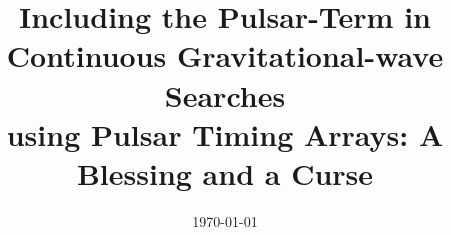 \documentclass[prd,showpacs,nofootinbib]{revtex4}
\begin{document}
\title{Including the Pulsar-Term in Continuous Gravitational-wave Searches\\ using Pulsar Timing Arrays: A Blessing and a Curse}


\date{\today}

\end{document}
